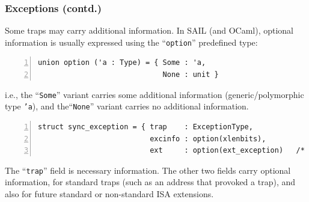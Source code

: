 \documentclass[aspectratio=169]{beamer}
\newcommand{\slidefont}{\scriptsize}
\newcommand{\cf}{\scriptsize\tt}
\begin{document}
\begin{frame}[fragile]
  \frametitle{Exceptions (contd.)}

  \slidefont

  Some traps may carry additional information.  In SAIL (and OCaml),
  optional information is usually expressed using the ``{\cf option}''
  predefined type:

  \begin{Verbatim}[frame=single, numbers=left, label = predefined]
union option ('a : Type) = { Some : 'a,
                             None : unit }
  \end{Verbatim}

  i.e., the ``{\cf Some}'' variant carries some additional information
  (generic/polymorphic type {\cf 'a}), and the``{\cf None}'' variant
  carries no additional information.

  \vspace{1ex}

  \begin{Verbatim}[frame=single, numbers=left, label = File riscv\_sync\_exception.sail]
struct sync_exception = { trap    : ExceptionType,
                          excinfo : option(xlenbits),
                          ext     : option(ext_exception)   /* for extensions */ }
  \end{Verbatim}

  \begin{minipage}{\textwidth}
    The ``{\cf trap}'' field is necessary information.  The other two
    fields carry optional information, for standard traps (such as an
    address that provoked a trap), and also for future standard or
    non-standard ISA extensions.
  \end{minipage}

\end{frame}

\end{document}
